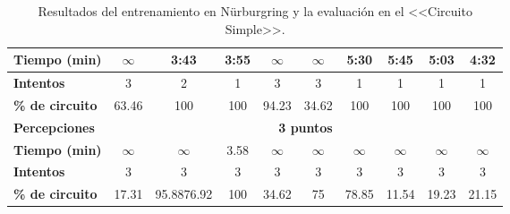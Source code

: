 \begin{table}[ht!]
\begin{tabular}{|l|c|c|c|c|c|c|c|c|c|}
\cellcolor[HTML]{EFEFEF}\textbf{Tiempo (min)}          & $\infty$                        & 3:43       & 3:55                        & $\infty$                        & $\infty$                        & 5:30       & 5:45                & 5:03               & 4:32               \\ \hline
\cellcolor[HTML]{EFEFEF}\textbf{Intentos}                  & 3                             & 2          & 1                           & 3                             & 3                             & 1          & 1                   & 1                  & 1                  \\ \hline
\rowcolor[HTML]{32CB00} 
\cellcolor[HTML]{EFEFEF}\textbf{\% de circuito}            & \cellcolor[HTML]{FFC702}63.46 & 100        & 100                         & \cellcolor[HTML]{FFC702}94.23 & \cellcolor[HTML]{FFC702}34.62 & 100        & 100                 & 100                & 100                \\ \hline
\rowcolor[HTML]{EFEFEF} 
\textbf{Percepciones}                              & \multicolumn{9}{c|}{\cellcolor[HTML]{EFEFEF}\textbf{3 puntos}}                                                                                                                                                        \\ \hline
\cellcolor[HTML]{EFEFEF}\textbf{Tiempo (min)} & $\infty$                        & $\infty$     & 3.58                        & $\infty$                        & $\infty$                        & $\infty$     & $\infty$              & $\infty$             & $\infty$             \\ \hline
\cellcolor[HTML]{EFEFEF}\textbf{Intentos}         & 3                             & 3          & 3                           & 3                             & 3                             & 3          & 3                   & 3                  & 3                  \\ \hline
\rowcolor[HTML]{FFC702} 
\cellcolor[HTML]{EFEFEF}\textbf{\% de circuito}   & 17.31                         & 95.8876.92 & \cellcolor[HTML]{32CB00}100 & 34.62                         & 75                            & 78.85      & 11.54               & 19.23              & 21.15              \\ \hline
\end{tabular}
\caption{Resultados del entrenamiento en Nürburgring y la evaluación en el <<Circuito Simple>>.}
\label{tab:entrenamiento-nurbur-evaluacion-simple}
\end{table}


